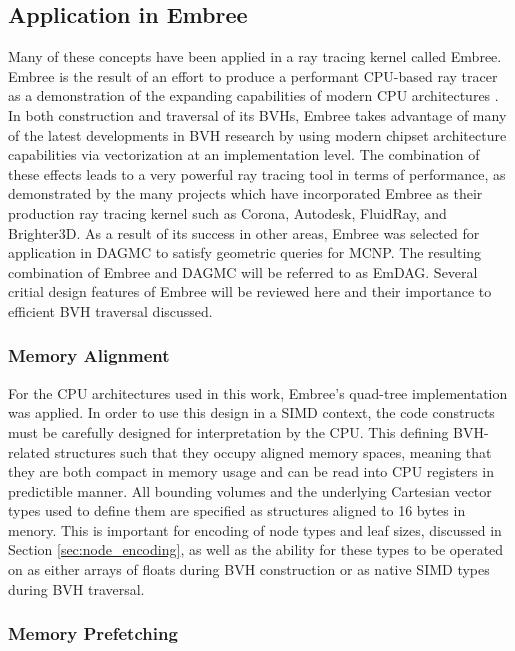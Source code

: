 \subsection{Application in Embree}

Many of these concepts have been applied in a ray tracing kernel called Embree.
Embree is the result of an effort to produce a performant CPU-based ray tracer
as a demonstration of the expanding capabilities of modern CPU architectures
\cite{Wald_2014}. In both construction and traversal of its BVHs, Embree takes
advantage of many of the latest developments in BVH research by using modern
chipset architecture capabilities via vectorization at an implementation level.
The combination of these effects leads to a very powerful ray tracing tool in
terms of performance, as demonstrated by the many projects which have
incorporated Embree as their production ray tracing kernel such as Corona,
Autodesk, FluidRay, and Brighter3D. As a result of its success in other areas,
Embree was selected for application in DAGMC to satisfy geometric queries for
MCNP. The resulting combination of Embree and DAGMC will be referred to as
EmDAG. Several critial design features of Embree will be reviewed here and their
importance to efficient BVH traversal discussed.

\subsubsection{Memory Alignment}

For the CPU architectures used in this work, Embree's quad-tree implementation
was applied. In order to use this design in a SIMD context, the code constructs
must be carefully designed for interpretation by the CPU. This defining
BVH-related structures such that they occupy aligned memory spaces, meaning that
they are both compact in memory usage and can be read into CPU registers in
predictible manner. All bounding volumes and the underlying Cartesian vector
types used to define them are specified as structures aligned to 16 bytes in
menory. This is important for encoding of node types and leaf sizes, discussed
in Section \ref{sec:node_encoding}, as well as the ability for these types to be
operated on as either arrays of floats during BVH construction or as native SIMD
types during BVH traversal.

\subsubsection{Memory Prefetching}

